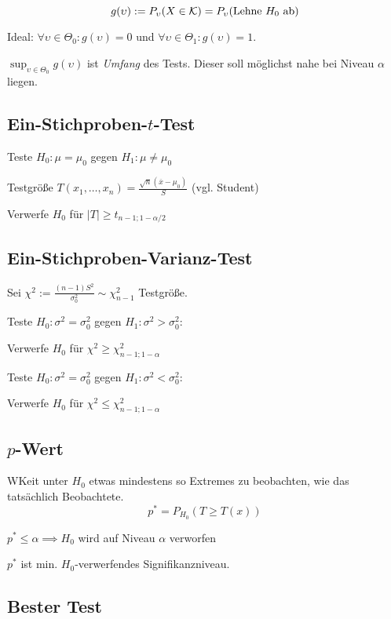 \[ g(\upsilon) := P_\upsilon(X \in \mathcal{K}) = P_\upsilon(\text{Lehne \(H_0\) ab}) \]

Ideal: \(\forall \upsilon \in \Theta_0 : g(\upsilon) = 0\) und \(\forall \upsilon \in \Theta_1 : g(\upsilon) = 1\).

\(\sup_{\upsilon \in \Theta_0} g(\upsilon)\) ist \emph{Umfang} des Tests. Dieser soll möglichst nahe bei Niveau \(\alpha\) liegen.

\subsection*{Ein-Stichproben-\(t\)-Test}

Teste \(H_0 : \mu = \mu_0\) gegen \(H_1 : \mu \neq \mu_0\)

Testgröße \(T(x_1,\dots,x_n) = \frac{\sqrt{n}(\overline x - \mu_0)}{S}\) (vgl. Student)

Verwerfe \(H_0\) für \(|T| \geq t_{n-1;1-\alpha/2}\)

\subsection*{Ein-Stichproben-Varianz-Test}

Sei \(\chi^2 := \frac{(n-1)S^2}{\sigma_0^2} \sim \chi_{n-1}^2\) Testgröße.

Teste \(H_0 : \sigma^2 = \sigma_0^2\) gegen \(H_1 : \sigma^2 > \sigma_0^2\):

Verwerfe \(H_0\) für \(\chi^2 \geq \chi_{n-1;1-\alpha}^2\)

\spacing

Teste \(H_0 : \sigma^2 = \sigma_0^2\) gegen \(H_1 : \sigma^2 < \sigma_0^2\):

Verwerfe \(H_0\) für \(\chi^2 \leq \chi_{n-1;1-\alpha}^2\)

\subsection*{\(p\)-Wert}

WKeit unter \(H_0\) etwas mindestens so Extremes zu beobachten, wie das tatsächlich Beobachtete.
\[ p^\ast = P_{H_0}(T \geq T(x)) \]

\(p^\ast \leq \alpha \implies H_0\) wird auf Niveau \(\alpha\) verworfen

\(p^\ast\) ist min. \(H_0\)-verwerfendes Signifikanzniveau.

\subsection*{Bester Test}

